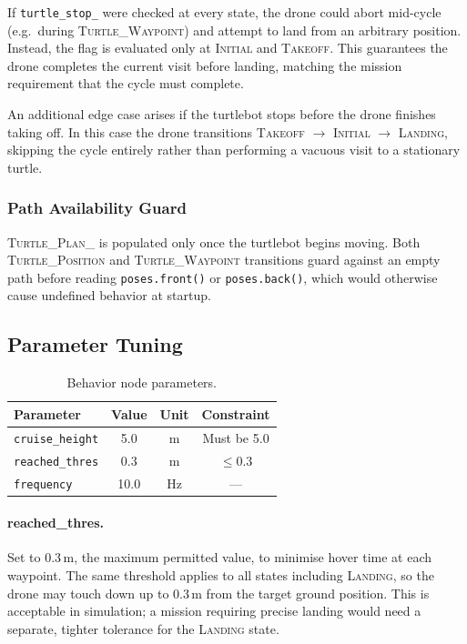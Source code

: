 \documentclass[12pt,twoside,letterpaper]{article}
\begin{document}
If \texttt{turtle\_stop\_} were checked at every state, the drone could abort mid-cycle (e.g.\ during \textsc{Turtle\_Waypoint}) and attempt to land from an arbitrary position. Instead, the flag is evaluated only at \textsc{Initial} and \textsc{Takeoff}. This guarantees the drone completes the current visit before landing, matching the mission requirement that the cycle must complete.

An additional edge case arises if the turtlebot stops before the drone finishes taking off. In this case the drone transitions \textsc{Takeoff} $\to$ \textsc{Initial} $\to$ \textsc{Landing}, skipping the cycle entirely rather than performing a vacuous visit to a stationary turtle.

\subsubsection{Path Availability Guard}

\textsc{Turtle\_Plan\_} is populated only once the turtlebot begins moving. Both \textsc{Turtle\_Position} and \textsc{Turtle\_Waypoint} transitions guard against an empty path before reading \texttt{poses.front()} or \texttt{poses.back()}, which would otherwise cause undefined behavior at startup.

\subsection{Parameter Tuning}

\begin{table}[htbp]
    \centering
    \caption{Behavior node parameters.}
    \label{tab:behavior_params}
    \vspace{0.1cm}
    \begin{tabular}{lccc}
        \toprule
        \textbf{Parameter} & \textbf{Value} & \textbf{Unit} & \textbf{Constraint} \\
        \midrule
        \texttt{cruise\_height} & 5.0  & m   & Must be 5.0 \\
        \texttt{reached\_thres} & 0.3  & m   & $\leq 0.3$ \\
        \texttt{frequency}      & 10.0 & Hz  & --- \\
        \bottomrule
    \end{tabular}
\end{table}

\paragraph{reached\_thres.}
Set to $0.3\,\text{m}$, the maximum permitted value, to minimise hover time at each waypoint. The same threshold applies to all states including \textsc{Landing}, so the drone may touch down up to $0.3\,\text{m}$ from the target ground position. This is acceptable in simulation; a mission requiring precise landing would need a separate, tighter tolerance for the \textsc{Landing} state.
\end{document}
